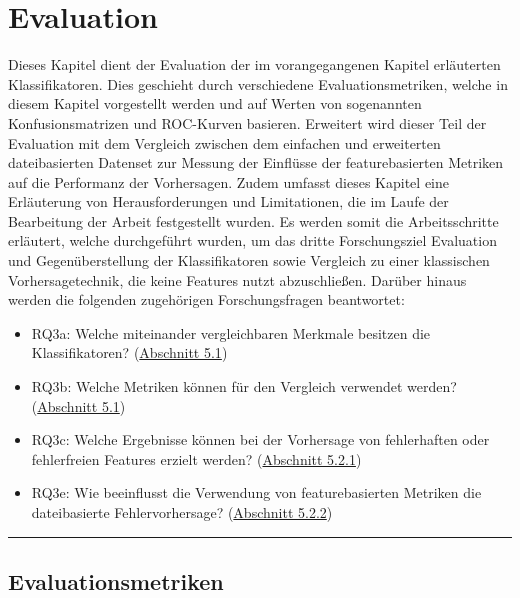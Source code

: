 
\chapter{Evaluation}
\label{evaluation}

Dieses Kapitel dient der Evaluation der im vorangegangenen Kapitel erläuterten Klassifikatoren. Dies geschieht durch verschiedene Evaluationsmetriken, welche in diesem Kapitel vorgestellt werden und auf Werten von sogenannten Konfusionsmatrizen und ROC-Kurven basieren. Erweitert wird dieser Teil der Evaluation mit dem Vergleich zwischen dem \glqq einfachen\grqq{} und erweiterten dateibasierten Datenset zur Messung der Einflüsse der featurebasierten Metriken auf die Performanz der Vorhersagen. Zudem umfasst dieses Kapitel eine Erläuterung von Herausforderungen und Limitationen, die im Laufe der Bearbeitung der Arbeit festgestellt wurden. Es werden somit die Arbeitsschritte erläutert, welche durchgeführt wurden, um das dritte Forschungsziel \glqq Evaluation und Gegenüberstellung der Klassifikatoren sowie Vergleich zu einer klassischen Vorhersagetechnik, die keine Features nutzt\grqq{} abzuschließen. Darüber hinaus werden die folgenden zugehörigen Forschungsfragen beantwortet:
\vspace{-\topsep}
\begin{itemize}
\setlength{\itemsep}{-2pt}
 \item RQ3a: Welche miteinander vergleichbaren Merkmale besitzen die Klassifikatoren? (\hyperref[eval-metrics]{Abschnitt 5.1})
 \item RQ3b: Welche Metriken können für den Vergleich verwendet werden? (\hyperref[eval-metrics]{Abschnitt 5.1})
 \item RQ3c: Welche Ergebnisse können bei der Vorhersage von fehlerhaften oder fehlerfreien Features erzielt werden? (\hyperref[feat-results]{Abschnitt 5.2.1})
 \item RQ3e: Wie beeinflusst die Verwendung von featurebasierten Metriken die dateibasierte Fehlervorhersage? (\hyperref[classic-eval]{Abschnitt 5.2.2})
\end{itemize} 
\smallskip
\hrule

\section{Evaluationsmetriken}
\label{eval-metrics}

